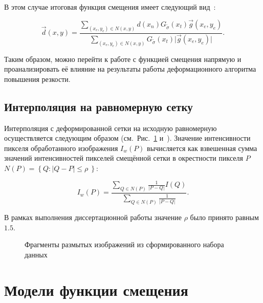 В этом случае итоговая функция смещения имеет следующий вид~\cite{gusev2016parallel}:

\begin{equation*}
	\vec{d}\left(x,y\right) = \frac{\sum_{\left(x_e,y_e\right) \in N\left(x,y\right)}{d\left(x_n\right) G_{\widetilde{\sigma}}\left(x_t\right) \vec{g}\left(x_e,y_e\right) }} {\sum_{\left(x_e,y_e\right) \in N\left(x,y\right)}{G_{\widetilde{\sigma}}\left(x_t\right)\lvert \vec{g}\left(x_e,y_e\right) \rvert}}.
\end{equation*}

Таким образом, можно перейти к работе с функцией смещения напрямую и проанализировать её влияние на результаты работы деформационного алгоритма повышения резкости.

\subsection{Интерполяция на равномерную сетку}

Интерполяция с деформированной сетки на исходную равномерную осуществляется следующим образом (см.~Рис.~\ref{fig:warping-interpolation} и~\cite{krylov2014gridwarping}). Значение интенсивности пикселя обработанного изображения $I_w(P)$ вычисляется как взвешенная сумма значений интенсивностей пикселей смещённой сетки в окрестности пикселя $P$ $N\left(P\right) = \left\{ Q: \lvert Q - P \rvert \leq \rho\ \right\}$:

\begin{equation*}
	I_w(P)=\frac{\sum_{Q \in N\left(P\right)} \frac{1}{\lvert P - Q \rvert} I(Q)}{\sum_{Q \in N\left(P\right)} \frac{1}{\lvert P - Q \rvert}}.
\end{equation*}

В рамках выполнения диссертационной работы значение $\rho$ было принято равным $1.5$.

\begin{figure}[ht]
	\caption{Фрагменты размытых изображений из сформированного набора данных}
	\label{fig:warping-interpolation}
\end{figure}


\section{Модели функции смещения}

